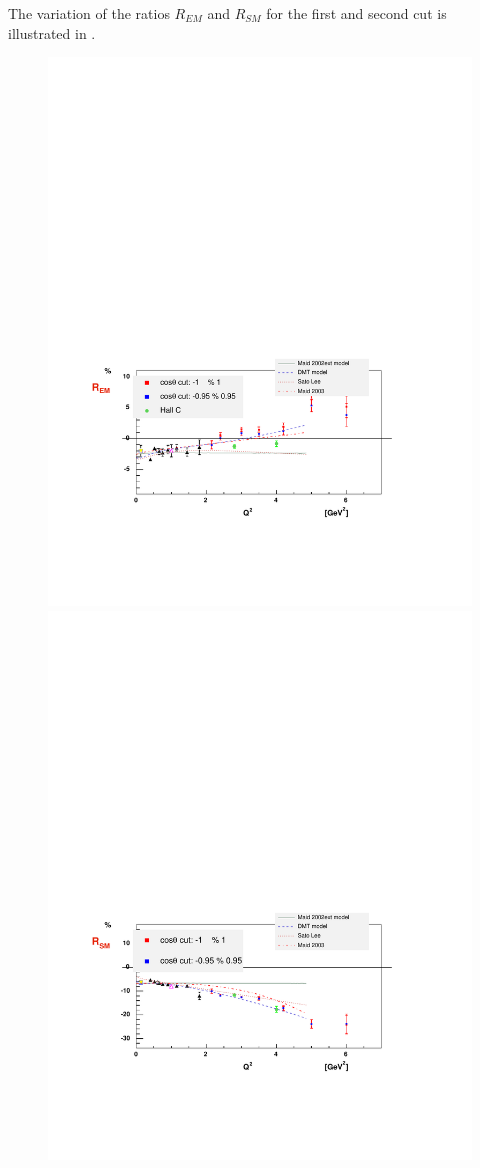 The variation of the ratios $R_{EM}$ and $R_{SM}$ for the first and second cut is illustrated in 
.
\begin{figure}[h]
 \begin{center}
  \includegraphics[width = 12cm, bb = 50 120 540 440]{systematics/img/rem_ccsyst}
  \includegraphics[width = 12cm, bb = 50 100 540 440]{systematics/img/rsm_ccsyst}

\end{center}
\end{figure}
